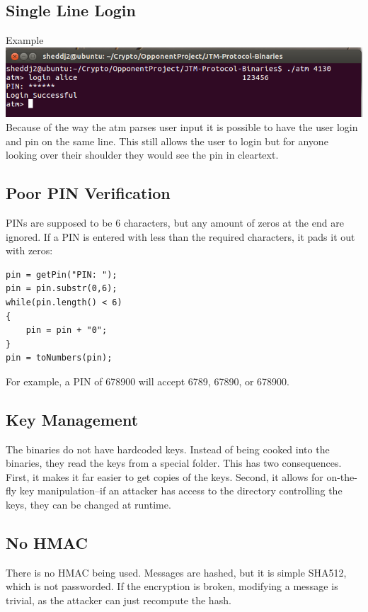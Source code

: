 \documentclass{article}
\begin{document}
\subsection{Single Line Login}
Example
\\
\includegraphics[scale=0.5]{OneLineLogin.png}
\\
Because of the way the atm parses user input it is possible to have the user login and pin on the same line. This still allows the user to login but for anyone looking over their shoulder they would see the pin in cleartext.

\subsection{Poor PIN Verification}
PINs are supposed to be 6 characters, but any amount of zeros at the end are ignored. If a PIN is entered with less than the required characters, it pads it out with zeros:
\begin{lstlisting}
pin = getPin("PIN: ");
pin = pin.substr(0,6);
while(pin.length() < 6)
{
    pin = pin + "0";
}
pin = toNumbers(pin);
\end{lstlisting}
For example, a PIN of 678900 will accept 6789, 67890, or 678900.

\subsection{Key Management}
The binaries do not have hardcoded keys. Instead of being cooked into the binaries, they read the keys from a special folder. This has two consequences. First, it makes it far easier to get copies of the keys. Second, it allows for on-the-fly key manipulation--if an attacker has access to the directory controlling the keys, they can be changed at runtime.

\subsection{No HMAC}
There is no HMAC being used. Messages are hashed, but it is simple SHA512, which is not passworded. If the encryption is broken, modifying a message is trivial, as the attacker can just recompute the hash.
\end{document}

